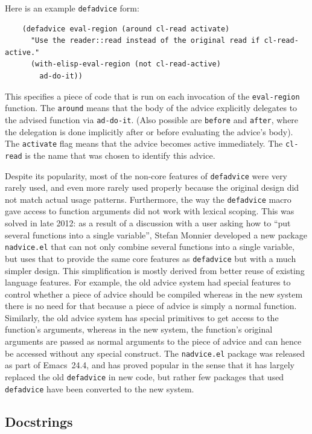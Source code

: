 \documentclass[format=acmsmall,screen]{acmart}
\begin{document}
Here is an example \texttt{defadvice} form:
%
\begin{verbatim}
    (defadvice eval-region (around cl-read activate)
      "Use the reader::read instead of the original read if cl-read-active."
      (with-elisp-eval-region (not cl-read-active)
        ad-do-it))
\end{verbatim}
%
This specifies a piece of code that is run on each invocation of the
\texttt{eval-region} function.  The \texttt{around} means that the
body of the advice explicitly delegates to the
advised function via \texttt{ad-do-it}.  (Also possible are
\texttt{before} and \texttt{after}, where the delegation is done implicitly
after or before evaluating the advice's body).  The
\texttt{activate} flag means that the advice becomes active
immediately.  The \texttt{cl-read} is the name that was chosen to identify
this advice.

Despite its popularity, most of the non-core features of \texttt{defadvice}
were very rarely used, and even more rarely used properly because the
original design did not match actual usage patterns.  Furthermore, the way
the \texttt{defadvice} macro gave access to function arguments did not work
with lexical scoping.  This was solved in late 2012: as a result of
a discussion with a user asking how to ``put several functions into
a single variable'', Stefan Monnier developed a new package
\texttt{nadvice.el} that can not only combine several functions into
a single variable, but uses that to provide the same core features as
\texttt{defadvice} but with a much simpler design.  This simplification is
mostly derived from better reuse of existing language features.
For example, the old advice system had special features to control whether
a piece of advice should be compiled whereas in the new system there is no
need for that because a piece of advice is simply a normal function.
Similarly, the old advice system has special primitives to get access to the
function's arguments, whereas in the new system, the function's original
arguments are passed as normal arguments to the piece of advice and can
hence be accessed without any special construct.  The \texttt{nadvice.el}
package was released as part of Emacs~24.4, and has proved popular in the
sense that it has largely replaced the old \texttt{defadvice} in new code,
but rather few packages that used \texttt{defadvice} have been converted to
the new system.

\subsection{Docstrings}
\label{sec:docstrings}
\end{document}
